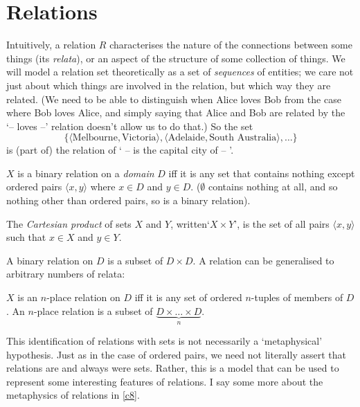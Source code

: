 \section{Relations}
Intuitively, a relation $R$ characterises the nature of the connections between some things (its \emph{relata}), or an aspect of the structure of some collection of things. We will model a relation set theoretically as a set of \emph{sequences} of entities; we care not just about which things are involved in the relation, but which way they are related. (We need to be able to distinguish when Alice loves Bob from the case where Bob loves Alice, and simply saying that Alice and Bob are related by the `– loves –' relation doesn't allow us to do that.)  So the set $$\{\langle \text{Melbourne}, \text{Victoria}\rangle, \langle \text{Adelaide}, \text{South Australia}\rangle,\ldots\}$$ is (part of) the relation of ` –  is the capital city of  – '.
\begin{definition}
	$X$ is a binary relation on a \emph{domain} $D$ iff it is any set that contains nothing except ordered pairs $\langle x,y\rangle$ where $x \in D$ and $y\in D$. ($\emptyset$ contains nothing at all, and so nothing other than ordered pairs, so is a binary relation).
\end{definition}
\begin{definition}
	The \emph{Cartesian product} of sets $X$ and 	$Y$, written‘$X \times Y$’, is the set of all pairs $\langle x,y\rangle$ such that $x \in X$ and $y \in Y$.
\end{definition} A binary relation on $D$ is a subset of $D \times D$. A relation can be generalised to arbitrary numbers of relata: 
\begin{definition}
  $X$ is an $n$-place relation on $D$ iff it is any set of ordered $n$-tuples of members of $D$. An $n$-place relation is a subset of $\underbrace{D \times \ldots \times D}_{n}$.
\end{definition}
This identification of relations with sets is not necessarily a `metaphysical' hypothesis. Just as in the case of ordered pairs, we need not literally assert that relations are and always were sets. Rather, this is a model that can be used to represent some interesting features of relations. I say some more about the metaphysics of relations in \autoref{c8}.


